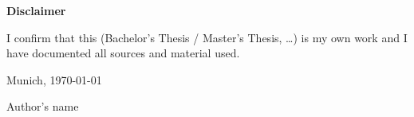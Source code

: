 \cleardoublepage{}

\thispagestyle{empty}

\vspace*{0.5\textheight}
\noindent

\makeatletter

\begin{center}
    {\textbf{Disclaimer}}
\end{center}

\begin{flushleft}
    {I confirm that this (Bachelor's Thesis / Master's Thesis, \ldots) is my own work and I have documented all sources and material used.}

    \makeatother

    \vspace{15mm}
    \noindent

    Munich, \today{}

    Author's name
\end{flushleft}

\cleardoublepage{}
